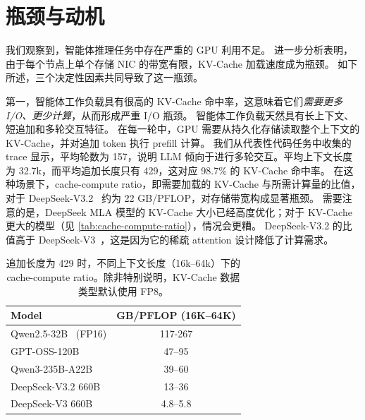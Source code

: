 \section{瓶颈与动机}
\label{sec:motivations}

我们观察到，智能体推理任务中存在严重的 GPU 利用不足。
进一步分析表明，由于每个节点上单个存储 NIC 的带宽有限，KV-Cache 加载速度成为瓶颈。
如下所述，三个决定性因素共同导致了这一瓶颈。


第一，智能体工作负载具有很高的 KV-Cache 命中率，这意味着它们\emph{需要更多 I/O、更少计算}，从而形成严重 I/O 瓶颈。
智能体工作负载天然具有长上下文、短追加和多轮交互特征。
在每一轮中，GPU 需要从持久化存储读取整个上下文的 KV-Cache，并对追加 token 执行 prefill 计算。
我们从代表性代码任务中收集的 trace 显示，平均轮数为 157，说明 LLM 倾向于进行多轮交互。平均上下文长度为 32.7k，而平均追加长度只有 429，这对应 98.7\% 的 KV-Cache 命中率。
在这种场景下，cache-compute ratio，即需要加载的 KV-Cache 与所需计算量的比值，对于 DeepSeek-V3.2~\cite{DeepSeekV32} 约为 22 GB/PFLOP，对存储带宽构成显著瓶颈。
需要注意的是，DeepSeek MLA 模型的 KV-Cache 大小已经高度优化；对于 KV-Cache 更大的模型（见 \autoref{tab:cache-compute-ratio}），情况会更糟。
DeepSeek-V3.2 的比值高于 DeepSeek-V3~\cite{deepseekv3}，这是因为它的稀疏 attention 设计降低了计算需求。

\begin{table}[t]
  \centering
  \caption{\normalfont 追加长度为 429 时，不同上下文长度（16k--64k）下的 cache-compute ratio。除非特别说明，KV-Cache 数据类型默认使用 FP8。}
  \begin{tabular}{lc}
  \toprule
  Model & GB/PFLOP (16K--64K) \\
  \midrule
  Qwen2.5-32B~\cite{qwen2025qwen25technicalreport} (FP16) & 117-267 \\
  GPT-OSS-120B~\cite{GPT-OSS} & 47--95 \\
  Qwen3-235B-A22B~\cite{yang2025qwen3technicalreport} & 39--60 \\
  DeepSeek-V3.2 660B~\cite{DeepSeekV32} & 13--36 \\
  DeepSeek-V3 660B~\cite{deepseekv3} & 4.8--5.8 \\
  \bottomrule
  \end{tabular}
  \label{tab:cache-compute-ratio}
\end{table}

